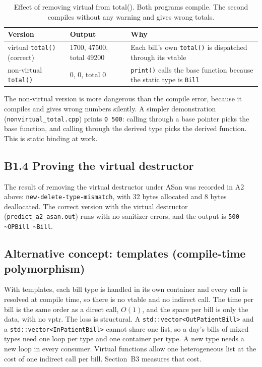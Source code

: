 \documentclass[11pt,a4paper]{article}
\newcommand{\lstout}[2]{}
\begin{document}
\lstout{../Task03_Billing_CompleteCode/b13_nonvirtual_total.out}{Output with non-virtual total(): every bill prints 0}

\begin{table}[H]
\centering
\small
\begin{tabular}{@{}lll@{}}
\toprule
\textbf{Version} & \textbf{Output} & \textbf{Why} \\
\midrule
virtual \texttt{total()} (correct) & 1700, 47500, total 49200 & Each bill's own \texttt{total()} is dispatched through its vtable \\
non-virtual \texttt{total()} & 0, 0, total 0 & \texttt{print()} calls the base function because the static type is \texttt{Bill} \\
\bottomrule
\end{tabular}
\caption{Effect of removing virtual from total(). Both programs compile. The second compiles without any warning and gives wrong totals.}\label{tab:b13}
\end{table}

\noindent The non-virtual version is more dangerous than the compile error, because it compiles and gives wrong numbers silently. A simpler demonstration (\texttt{nonvirtual\_total.cpp}) prints \texttt{0 500}: calling through a base pointer picks the base function, and calling through the derived type picks the derived function. This is static binding at work.

\subsection*{B1.4 Proving the virtual destructor}
The result of removing the virtual destructor under ASan was recorded in A2 above: \texttt{new-delete-type-mismatch}, with 32 bytes allocated and 8 bytes deallocated. The correct version with the virtual destructor (\texttt{predict\_a2\_asan.out}) runs with no sanitizer errors, and the output is \texttt{500 \~{}OPBill \~{}Bill}.

\subsection*{Alternative concept: templates (compile-time polymorphism)}
With templates, each bill type is handled in its own container and every call is resolved at compile time, so there is no vtable and no indirect call. The time per bill is the same order as a direct call, $O(1)$, and the space per bill is only the data, with no vptr. The loss is structural. A \texttt{std::vector<OutPatientBill>} and a \texttt{std::vector<InPatientBill>} cannot share one list, so a day's bills of mixed types need one loop per type and one container per type. A new type needs a new loop in every consumer. Virtual functions allow one heterogeneous list at the cost of one indirect call per bill. Section~B3 measures that cost.
\end{document}
